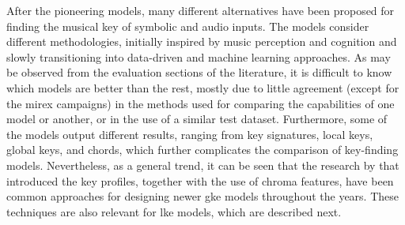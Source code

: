 After the pioneering models, many different alternatives
have been proposed for finding the musical key of symbolic
and audio inputs. The models consider different
methodologies, initially inspired by music perception and
cognition and slowly transitioning into data-driven and
machine learning approaches. As may be observed from the
evaluation sections of the literature, it is difficult to
know which models are better than the rest, mostly due to
little agreement (except for the \gls{mirex} campaigns) in
the methods used for comparing the capabilities of one model
or another, or in the use of a similar test dataset.
Furthermore, some of the models output different results,
ranging from key signatures, local keys, global keys, and
chords, which further complicates the comparison of
key-finding models. Nevertheless, as a general trend, it can
be seen that the research by \textcite{krumhansl1982tracing}
that introduced the key profiles, together with the use of
chroma features, have been common approaches for designing
newer \gls{gke} models throughout the years. These
techniques are also relevant for \gls{lke} models, which are
described next.
